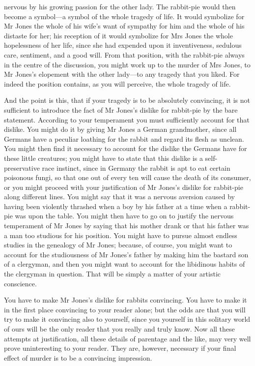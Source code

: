 nervous by his growing passion for the other lady. The rabbit-pie would
then become a symbol---a symbol of the whole tragedy of life. It would
symbolize for Mr Jones the whole of his wife's want of sympathy for him
and the whole of his distaste for her; his reception of it would
symbolize for Mrs Jones the whole hopelessness of her life, since she
had expended upon it inventiveness, sedulous care, sentiment, and a good
will. From that position, with the rabbit-pie always in the centre of
the discussion, you might work up to the murder of Mrs Jones, to Mr
Jones's elopement with the other lady---to any tragedy that you liked.
For indeed the position contains, as you will perceive, the whole
tragedy of life.

And the point is this, that if your tragedy is to be absolutely
convincing, it is not sufficient to introduce the fact of Mr Jones's
dislike for rabbit-pie by the bare statement. According to your
temperament you must sufficiently account for that dislike. You might do
it by giving Mr Jones a German grandmother, since all Germans have a
peculiar loathing for the rabbit and regard its flesh as unclean. You
might then find it necessary to account for the dislike the Germans have
for these little creatures; you might have to state that this dislike is
a self-preservative race instinct, since in Germany the rabbit is apt to
eat certain poisonous fungi, so that one out of every ten will cause the
death of its consumer, or you might proceed with your justification of
Mr Jones's dislike for rabbit-pie along different lines. You might say
that it was a nervous aversion caused by having been violently thrashed
when a boy by his father at a time when a rabbit-pie was upon the table.
You might then have to go on to justify the nervous temperament of Mr
Jones by saying that his mother drank or that his father was a man too
studious for his position. You might have to pursue almost endless
studies in the genealogy of Mr Jones; because, of course, you might want
to account for the studiousness of Mr Jones's father by making him the
bastard son of a clergyman, and then you might want to account for the
libidinous habits of the clergyman in question. That will be simply a
matter of your artistic conscience.

You have to make Mr Jones's dislike for rabbits convincing. You have to
make it in the first place convincing to your reader alone; but the odds
are that you will try to make it convincing also to yourself, since you
yourself in this solitary world of ours will be the only reader that you
really and truly know. Now all these attempts at justification, all
these details of parentage and the like, may very well prove
uninteresting to your reader. They are, however, necessary if your final
effect of murder is to be a convincing impression.

